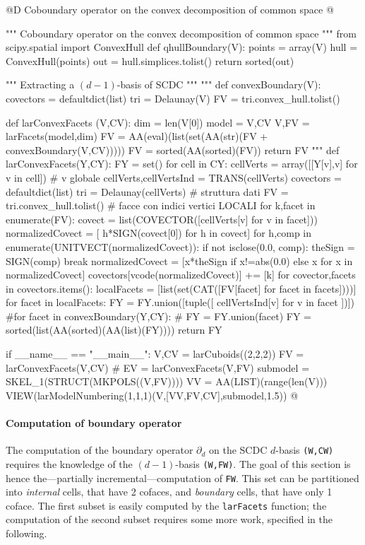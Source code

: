 \documentclass[11pt,oneside]{article}	%
\begin{document}
@D Coboundary operator on the convex decomposition of common space
@{""" Coboundary operator on the convex decomposition of common space """
from scipy.spatial import ConvexHull
def qhullBoundary(V):
	points = array(V)
	hull = ConvexHull(points)
	out = hull.simplices.tolist()
	return sorted(out)

""" Extracting a $(d-1)$-basis of SCDC """
"""
def convexBoundary(V):
	covectors = defaultdict(list)
	tri = Delaunay(V)
	FV = tri.convex_hull.tolist()
	

def larConvexFacets (V,CV):
	dim = len(V[0])
	model = V,CV
	V,FV = larFacets(model,dim)
	FV = AA(eval)(list(set(AA(str)(FV + convexBoundary(V,CV)))))
	FV = sorted(AA(sorted)(FV))
	return FV
"""
def larConvexFacets(Y,CY):
	FY = set()
	for cell in CY:
		cellVerts = array([[Y[v],v] for v in cell])	   # v globale
		cellVerts,cellVertsInd = TRANS(cellVerts)
		covectors = defaultdict(list) 
		tri = Delaunay(cellVerts)   # struttura dati
		FV = tri.convex_hull.tolist()   # facce con indici vertici LOCALI
		for k,facet in enumerate(FV):
			covect = list(COVECTOR([cellVerts[v] for v in facet]))
			normalizedCovect = [ h*SIGN(covect[0])  for h in covect]
			for h,comp in enumerate(UNITVECT(normalizedCovect)): 
				if not isclose(0.0, comp): 
					theSign = SIGN(comp)
					break
			normalizedCovect = [x*theSign  if x!=abs(0.0) else x for x in normalizedCovect]
			covectors[vcode(normalizedCovect)] += [k]
		for covector,facets in covectors.items():
			localFacets = [list(set(CAT([FV[facet] for facet in facets])))]
			for facet in localFacets:
				FY = FY.union([tuple([ cellVertsInd[v] for v in facet ])])	
	#for facet in convexBoundary(Y,CY):			
	#	FY = FY.union(facet)	
	FY = sorted(list(AA(sorted)(AA(list)(FY))))
	return FY	

if __name__ == "__main__":
    V,CV = larCuboids((2,2,2))
    FV = larConvexFacets(V,CV)
    # EV = larConvexFacets(V,FV)
    submodel = SKEL_1(STRUCT(MKPOLS((V,FV))))
    VV = AA(LIST)(range(len(V)))
    VIEW(larModelNumbering(1,1,1)(V,[VV,FV,CV],submodel,1.5))
@}


\paragraph{Computation of boundary operator}

The computation of the boundary operator $\partial_d$ on the SCDC $d$-basis \texttt{(W,CW)} requires the knowledge of the $(d-1)$-basis \texttt{(W,FW)}. The goal of this section is hence the---partially incremental---computation of \texttt{FW}. This set can be partitioned into \emph{internal} cells, that have 2 cofaces, and \emph{boundary} cells, that have only 1 coface. The first subset is easily computed by the \texttt{larFacets} function; the computation of the second subset requires some more work, specified in the following.
\end{document}
